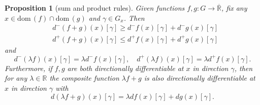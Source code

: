 \documentclass{article}
\theoremstyle{plain}\newtheorem{theorem}{Theorem}[section]
\theoremstyle{plain}\newtheorem{definition}[theorem]{Definition}
\theoremstyle{plain}\newtheorem{lemma}[theorem]{Lemma}
\theoremstyle{definition}\newtheorem{remark}[theorem]{Remark}
\theoremstyle{definition}\newtheorem{example}[theorem]{Example}
\theoremstyle{plain}\newtheorem{proposition}[theorem]{Proposition}
\theoremstyle{plain}\newtheorem{inference}[theorem]{Inference}
\theoremstyle{plain}\newtheorem{corollary}[theorem]{Corollary}
\theoremstyle{plain}\newtheorem{assumption}[theorem]{Assumption}
\newcommand{\extre}{\overline{\mathbb{R}}}
\begin{document}
\begin{proposition}[sum and product rules]\label{pr: sum rules}
    Given functions $f,g:G\to\extre$, fix any $x\in\mathrm{dom}\,(f)\cap\mathrm{dom}\,(g)$ and $\gamma\in G_x$. Then
    \begin{equation}\label{eq: sum rules 1}
        \begin{aligned}
            &d^-(f+g)(x)[\gamma]\geq  d^-f(x)[\gamma]+d^-g(x)[\gamma]\\
            &d^+(f+g)(x)[\gamma]\leq  d^+f(x)[\gamma]+d^+g(x)[\gamma]
        \end{aligned}
    \end{equation}
    and
    \begin{equation}\label{eq: multi rules 1}
        d^-(\lambda f)(x)[\gamma]=\lambda d^-f(x)[\gamma], \quad d^+(\lambda f)(x)[\gamma]=\lambda d^+f(x)[\gamma].
    \end{equation}
    Furthermore, if $f,g$ are both directionally differentiable at $x$ in direction $\gamma$, then for any $\lambda\in \mathbb{R}$ the composite function $\lambda f+g$ is also directionally differentiable at $x$ in direction $\gamma$ with
    \begin{equation}\label{eq: sum rules 2}
        d(\lambda f+g)(x)[\gamma]=\lambda df(x)[\gamma]+dg(x)[\gamma].
    \end{equation}
\end{proposition}
\end{document}

